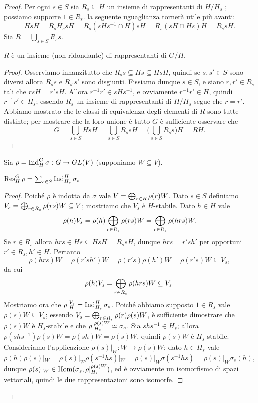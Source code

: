\begin{proof}
Per ogni $s\in S$ sia $R_s\subseteq H$ un insieme di rappresentanti di $H/H_s$ ; possiamo supporre $1\in R_s$. la seguente uguaglianza tornerà utile più avanti:
$$
HsH=R_sH_ssH=R_s(sHs^{-1}\cap H)sH=R_s(sH\cap Hs)H=R_ssH.
$$
Sia $R=\bigcup_{s\in S}R_ss$.
\begin{lemma*}
$R$ è un insieme (non ridondante) di rappresentanti di $G/H$.
\end{lemma*}
\begin{proof}
Osserviamo innanzitutto che $R_ss\subseteq Hs\subseteq HsH$, quindi se $s,s'\in S$ sono diversi allora $R_ss$ e $R_{s'}s'$ sono disgiunti. Fissiamo dunque $s\in S$, e siano $r,r'\in R_s$ tali che $rsH=r'sH$. Allora $r^{-1}r'\in sHs^{-1}$, e ovviamente $r^{-1}r'\in H$, quindi $r^{-1}r'\in H_s$; essendo $R_s$ un insieme di rappresentanti di $H/H_s$ segue che $r=r'$. Abbiamo mostrato che le classi di equivalenza degli elementi di $R$ sono tutte distinte; per mostrare che la loro unione è tutto $G$ è sufficiente osservare che
$$
G=\bigcup_{s\in S}HsH=\bigcup_{s\in S}R_ssH=\biggl(\bigcup_{s\in S}R_ss\biggr)H=RH.
$$
\end{proof}
Sia $\rho=\operatorname{Ind}_H^G\sigma:G\to GL(V)$ (supponiamo $W\subseteq V$).
\begin{lemma*}
$\operatorname{Res}_H^G\rho=\sum_{s\in S}\operatorname{Ind}_{H_s}^H\sigma_s$
\end{lemma*}
\begin{proof}
Poiché $\rho$ è indotta da $\sigma$ vale $V=\bigoplus_{r\in R}\rho(r)W$. Dato $s\in S$ definiamo $V_s=\bigoplus_{r\in R_s}\rho(rs)W\subseteq V$; mostriamo che $V_s$ è $H$-stabile. Dato $h\in H$ vale
$$
\rho(h)V_s=\rho(h)\bigoplus_{r\in R_s}\rho(rs)W=\bigoplus_{r\in R_s}\rho(hrs)W.
$$
Se $r\in R_s$ allora $hrs\in Hs\subseteq HsH=R_ssH$, dunque $hrs=r'sh'$ per opportuni $r'\in R_s\comma h'\in H$. Pertanto
$$
\rho(hrs)W=\rho(r'sh')W=\rho(r's)\rho(h')W=\rho(r's)W\subseteq V_s,
$$
da cui
$$
\rho(h)V_s=\bigoplus_{r\in R_s}\rho(hrs)W\subseteq V_s.
$$
Mostriamo ora che $\rho|_H^{V_s}=\operatorname{Ind}_{H_s}^H\sigma_s$. Poiché abbiamo supposto $1\in R_s$ vale $\rho(s)W\subseteq V_s$; essendo $V_s=\bigoplus_{r\in R_s}\rho(r)\rho(s)W$, è sufficiente dimostrare che $\rho(s)W$ è $H_s$-stabile e che $\rho|_{H_s}^{\rho(s)W}\simeq\sigma_s$. Sia $shs^{-1}\in H_s$; allora $\rho(shs^{-1})\rho(s)W=\rho(sh)W=\rho(s)W$, quindi $\rho(s)W$ è $H_s$-stabile. Consideriamo l'applicazione $\rho(s)|_W:W\to\rho(s)W$; dato $h\in H_s$ vale
$$
\rho(h)\rho(s)|_W=\rho(s)|_W\rho(s^{-1}hs)|_W=\rho(s)|_W\sigma(s^{-1}hs)=\rho(s)|_W\sigma_s(h),
$$
dunque $\rho(s)|_W\in\operatorname{Hom}(\sigma_s,\rho|_{H_s}^{\rho(s)W})$, ed è ovviamente un isomorfismo di spazi vettoriali, quindi le due rappresentazioni sono isomorfe.

\end{proof}
\end{proof}
